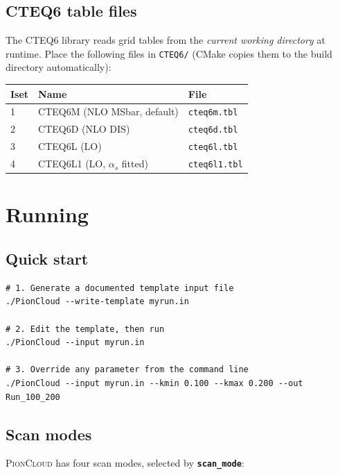 \documentclass[11pt,a4paper]{article}
\newcommand{\picloud}{\textsc{PionCloud}}
\newcommand{\inikey}[1]{\texttt{\textbf{#1}}}
\begin{document}
\subsection{CTEQ6 table files}

The CTEQ6 library reads grid tables from the \emph{current working
directory} at runtime.  Place the following files in \texttt{CTEQ6/}
(CMake copies them to the build directory automatically):

\begin{center}
\begin{tabular}{lll}
\toprule
\textbf{Iset} & \textbf{Name} & \textbf{File} \\
\midrule
1 & CTEQ6M (NLO MSbar, default) & \texttt{cteq6m.tbl} \\
2 & CTEQ6D (NLO DIS)             & \texttt{cteq6d.tbl} \\
3 & CTEQ6L (LO)                  & \texttt{cteq6l.tbl} \\
4 & CTEQ6L1 (LO, $\alpha_s$ fitted) & \texttt{cteq6l1.tbl} \\
\bottomrule
\end{tabular}
\end{center}

\section{Running}

\subsection{Quick start}

\begin{lstlisting}[style=bashstyle]
# 1. Generate a documented template input file
./PionCloud --write-template myrun.in

# 2. Edit the template, then run
./PionCloud --input myrun.in

# 3. Override any parameter from the command line
./PionCloud --input myrun.in --kmin 0.100 --kmax 0.200 --out Run_100_200
\end{lstlisting}

\subsection{Scan modes}

\picloud{} has four scan modes, selected by \inikey{scan\_mode}:
\end{document}
